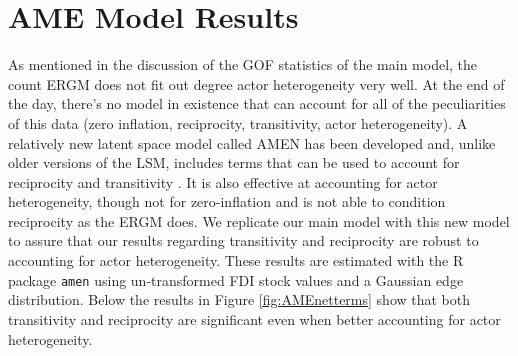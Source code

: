 \documentclass[reqno,onecolumn,letterpaper,12pt]{article}
\begin{document}
\section{AME Model Results}\label{AMEresults}

As mentioned in the discussion of the GOF statistics of the main model, the count ERGM does not fit out degree actor heterogeneity very well. At the end of the day, there's no model in existence that can account for all of the peculiarities of this data (zero inflation, reciprocity, transitivity, actor heterogeneity). A relatively new latent space model called AMEN has been developed and, unlike older versions of the LSM, includes terms that can be used to account for reciprocity and transitivity \citep{minhas2019inferential}. It is also effective at accounting for actor heterogeneity, though not for zero-inflation and is not able to condition reciprocity as the ERGM does. We replicate our main model with this new model to assure that our results regarding transitivity and reciprocity are robust to accounting for actor heterogeneity. These results are estimated with the R package \texttt{amen} \citep{amen} using un-transformed FDI stock values and a Gaussian edge distribution. Below the results in Figure \ref{fig:AMEnetterms} show that both transitivity and reciprocity are significant even when better accounting for actor heterogeneity.\\
\end{document}
